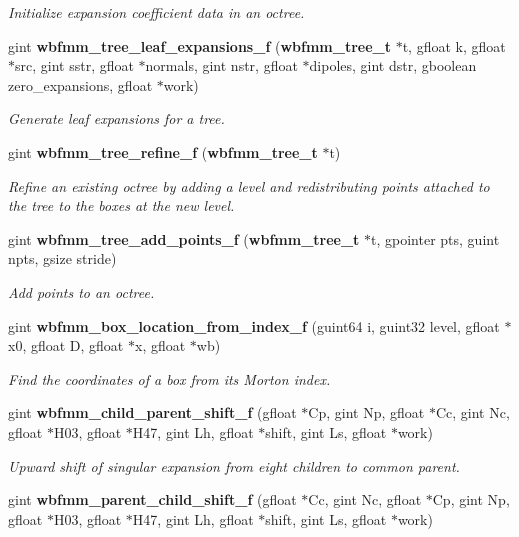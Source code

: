 \begin{DoxyCompactItemize}
\begin{DoxyCompactList}\small\item\em Initialize expansion coefficient data in an octree. \end{DoxyCompactList}\item 
gint {\bf wbfmm\+\_\+tree\+\_\+leaf\+\_\+expansions\+\_\+f} ({\bf wbfmm\+\_\+tree\+\_\+t} $\ast$t, gfloat k, gfloat $\ast$src, gint sstr, gfloat $\ast$normals, gint nstr, gfloat $\ast$dipoles, gint dstr, gboolean zero\+\_\+expansions, gfloat $\ast$work)
\begin{DoxyCompactList}\small\item\em Generate leaf expansions for a tree. \end{DoxyCompactList}\item 
gint {\bf wbfmm\+\_\+tree\+\_\+refine\+\_\+f} ({\bf wbfmm\+\_\+tree\+\_\+t} $\ast$t)
\begin{DoxyCompactList}\small\item\em Refine an existing octree by adding a level and redistributing points attached to the tree to the boxes at the new level. \end{DoxyCompactList}\item 
gint {\bf wbfmm\+\_\+tree\+\_\+add\+\_\+points\+\_\+f} ({\bf wbfmm\+\_\+tree\+\_\+t} $\ast$t, gpointer pts, guint npts, gsize stride)
\begin{DoxyCompactList}\small\item\em Add points to an octree. \end{DoxyCompactList}\item 
gint {\bf wbfmm\+\_\+box\+\_\+location\+\_\+from\+\_\+index\+\_\+f} (guint64 i, guint32 level, gfloat $\ast$x0, gfloat D, gfloat $\ast$x, gfloat $\ast$wb)
\begin{DoxyCompactList}\small\item\em Find the coordinates of a box from its Morton index. \end{DoxyCompactList}\item 
gint {\bf wbfmm\+\_\+child\+\_\+parent\+\_\+shift\+\_\+f} (gfloat $\ast$Cp, gint Np, gfloat $\ast$Cc, gint Nc, gfloat $\ast$H03, gfloat $\ast$H47, gint Lh, gfloat $\ast$shift, gint Ls, gfloat $\ast$work)
\begin{DoxyCompactList}\small\item\em Upward shift of singular expansion from eight children to common parent. \end{DoxyCompactList}\item 
gint {\bf wbfmm\+\_\+parent\+\_\+child\+\_\+shift\+\_\+f} (gfloat $\ast$Cc, gint Nc, gfloat $\ast$Cp, gint Np, gfloat $\ast$H03, gfloat $\ast$H47, gint Lh, gfloat $\ast$shift, gint Ls, gfloat $\ast$work)

\end{DoxyCompactItemize}

